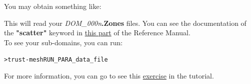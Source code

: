 You may obtain something like:
\begin{center}
\end{center}
This will read your \textit{DOM\_000n}\textbf{.Zones} files. You can see the documentation of the \textbf{"scatter"} keyword in \href{TRUST_Reference_Manual.pdf\#scatter}{this part} of the \trust Reference Manual.\\

To see your sub-domains, you can run:
\begin{alltt} 
> trust -mesh RUN_PARA_data_file
\end{alltt}

For more information, you can go to see this \href{TRUST_tutorial.pdf\#exo_para_1}{exercise} in the \trust tutorial.





